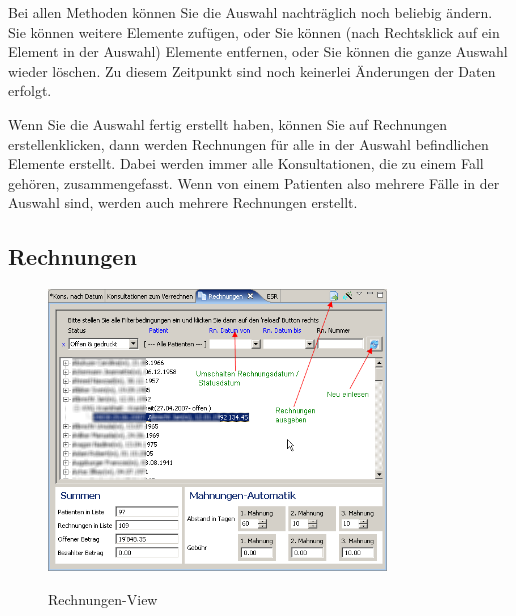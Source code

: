 Bei allen Methoden können Sie die Auswahl nachträglich noch beliebig ändern. Sie
können weitere Elemente zufügen, oder Sie können (nach Rechtsklick auf ein
Element in der Auswahl) Elemente entfernen, oder Sie können die ganze Auswahl
wieder löschen. Zu diesem Zeitpunkt sind noch keinerlei Änderungen der Daten
erfolgt.

Wenn Sie die Auswahl fertig erstellt haben, können Sie auf \glqq Rechnungen
erstellen\grqq klicken, dann werden Rechnungen für alle in der Auswahl
befindlichen Elemente erstellt. Dabei werden immer alle Konsultationen, die zu
einem Fall gehören, zusammengefasst. Wenn von einem Patienten also mehrere Fälle
in der Auswahl sind, werden auch mehrere Rechnungen erstellt.

\subsection{Rechnungen}
\begin{figure}[ht]
  \includegraphics[width=0.8\textwidth]{images/rechnungsview}\\
  \caption{Rechnungen-View}\label{fig:rechnungen}
\end{figure}

